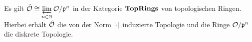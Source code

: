 \begin{Prop}
Es gilt $ \hat{\mathcal{O}} \cong \varprojlim\limits_{n\in\mathbb{N}} \mathcal{O} / \mathfrak{p}^n$ in der Kategorie $\textbf{\text{{TopRings}}}$ von topologischen Ringen. Hierbei erhält $\hat{\mathcal{O}}$ die von der Norm $\left|{\cdot}\right|$ induzierte Topologie und die Ringe $\mathcal{O} / \mathfrak{p}^n$ die diskrete Topologie.
\end{Prop}








